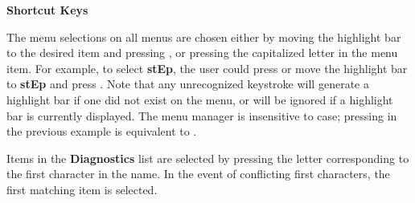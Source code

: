 \begin{section}
\begin{subsection}
{\bf Shortcut Keys}

   The menu selections on all menus are chosen either by moving the highlight
   bar to the desired item and pressing , or pressing the
   capitalized letter in the menu item.  For example, to select 
   {\bf stEp}, the user
   could press  or move the highlight bar to {\bf stEp} and 
   press 
   .  Note that any unrecognized keystroke will generate a highlight bar if one
   did not exist on the menu, or will be ignored if a highlight bar is
   currently displayed.  The menu manager is insensitive to case; pressing
    in the previous example is equivalent to .
\vspace{.2in}

\noindent
   Items in the {\bf Diagnostics} list are selected by pressing the letter
   corresponding to the first character in the name. In the event of
   conflicting first characters, the first matching item is selected.
\end{subsection}
\end{section}


